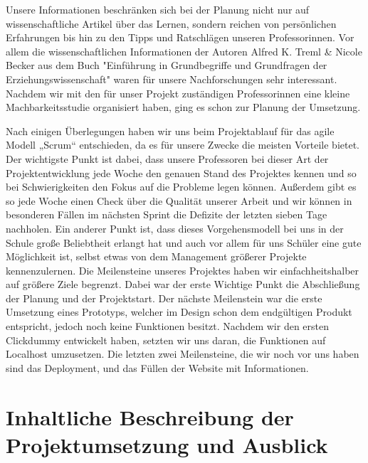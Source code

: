 Unsere Informationen beschränken sich bei der Planung nicht nur auf wissenschaftliche Artikel über das Lernen, sondern reichen von persönlichen Erfahrungen bis hin zu den Tipps und Ratschlägen unseren Professor\*innen. Vor allem die wissenschaftlichen Informationen der Autoren Alfred K. Treml \& Nicole Becker aus dem Buch "Einführung in Grundbegriffe und Grundfragen der Erziehungswissenschaft" waren für unsere Nachforschungen sehr interessant. Nachdem wir mit den für unser Projekt zuständigen Professor\*innen eine kleine Machbarkeitsstudie organisiert haben, ging es schon zur Planung der Umsetzung.  

Nach einigen Überlegungen haben wir uns beim Projektablauf für das agile Modell „Scrum“ entschieden, da es für unsere Zwecke die meisten Vorteile bietet. Der wichtigste Punkt ist dabei, dass unsere Professoren bei dieser Art der Projektentwicklung jede Woche den genauen Stand des Projektes kennen und so bei Schwierigkeiten den Fokus auf die Probleme legen können. Außerdem gibt es so jede Woche einen Check über die Qualität unserer Arbeit und wir können in besonderen Fällen im nächsten Sprint die Defizite der letzten sieben Tage nachholen. Ein anderer Punkt ist, dass dieses Vorgehensmodell bei uns in der Schule große Beliebtheit erlangt hat und auch vor allem für uns Schüler eine gute Möglichkeit ist, selbst etwas von dem Management größerer Projekte kennenzulernen. Die Meilensteine unseres Projektes haben wir einfachheitshalber auf größere Ziele begrenzt. Dabei war der erste Wichtige Punkt die Abschließung der Planung und der Projektstart. Der nächste Meilenstein war die erste Umsetzung eines Prototyps, welcher im Design schon dem endgültigen Produkt entspricht, jedoch noch keine Funktionen besitzt. Nachdem wir den ersten Clickdummy entwickelt haben, setzten wir uns daran, die Funktionen auf Localhost umzusetzen. Die letzten zwei Meilensteine, die wir noch vor uns haben sind das Deployment, und das Füllen der Website mit Informationen. 

\section{Inhaltliche Beschreibung der Projektumsetzung und Ausblick}

